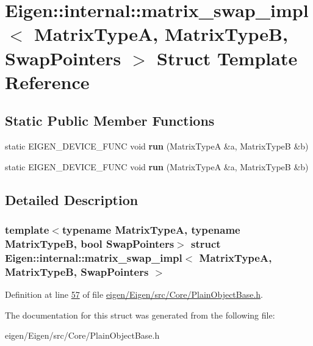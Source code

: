 \hypertarget{struct_eigen_1_1internal_1_1matrix__swap__impl}{}\section{Eigen\+:\+:internal\+:\+:matrix\+\_\+swap\+\_\+impl$<$ Matrix\+TypeA, Matrix\+TypeB, Swap\+Pointers $>$ Struct Template Reference}
\label{struct_eigen_1_1internal_1_1matrix__swap__impl}
\subsection*{Static Public Member Functions}
\begin{DoxyCompactItemize}
\item 
\mbox{\label{struct_eigen_1_1internal_1_1matrix__swap__impl_ae122306ad0aa65fcf0a8bf5e421179db}} 
static E\+I\+G\+E\+N\+\_\+\+D\+E\+V\+I\+C\+E\+\_\+\+F\+U\+NC void {\bfseries run} (Matrix\+TypeA \&a, Matrix\+TypeB \&b)
\item 
\mbox{\label{struct_eigen_1_1internal_1_1matrix__swap__impl_ae122306ad0aa65fcf0a8bf5e421179db}} 
static E\+I\+G\+E\+N\+\_\+\+D\+E\+V\+I\+C\+E\+\_\+\+F\+U\+NC void {\bfseries run} (Matrix\+TypeA \&a, Matrix\+TypeB \&b)
\end{DoxyCompactItemize}


\subsection{Detailed Description}
\subsubsection*{template$<$typename Matrix\+TypeA, typename Matrix\+TypeB, bool Swap\+Pointers$>$\newline
struct Eigen\+::internal\+::matrix\+\_\+swap\+\_\+impl$<$ Matrix\+Type\+A, Matrix\+Type\+B, Swap\+Pointers $>$}



Definition at line \hyperlink{eigen_2_eigen_2src_2_core_2_plain_object_base_8h_source_l00057}{57} of file \hyperlink{eigen_2_eigen_2src_2_core_2_plain_object_base_8h_source}{eigen/\+Eigen/src/\+Core/\+Plain\+Object\+Base.\+h}.



The documentation for this struct was generated from the following file\+:\begin{DoxyCompactItemize}
\item 
eigen/\+Eigen/src/\+Core/\+Plain\+Object\+Base.\+h\end{DoxyCompactItemize}
